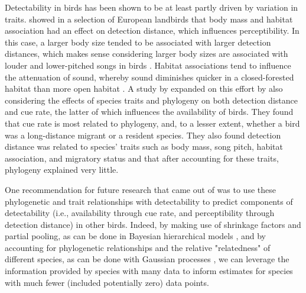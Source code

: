 \documentclass[12pt]{article}
\begin{document}
\par Detectability in birds has been shown to be at least partly driven by variation in traits.
\cite{johnston_species_2014} showed in a selection of European landbirds that body mass and habitat association had an effect on detection distance, which influences perceptibility.
In this case, a larger body size tended to be associated with larger detection distances, which makes sense considering larger body sizes are associated with louder and lower-pitched songs in birds \citep{bowman_adaptive_1979, fletcher_acoustics_1999, ryan_role_1985}.
Habitat associations tend to influence the attenuation of sound, whereby sound diminishes quicker in a closed-forested habitat than more open habitat \citep{waide_tropical_1988, yip_sound_2017}.
A study by \cite{solymos_phylogeny_2018} expanded on this effort by also considering the effects of species traits and phylogeny on both detection distance and cue rate, the latter of which influences the availability of birds.
They found that cue rate is most related to phylogeny, and, to a lesser extent, whether a bird was a long-distance migrant or a resident species.
They also found detection distance was related to species’ traits such as body mass, song pitch, habitat association, and migratory status and that after accounting for these traits, phylogeny explained very little.

\par One recommendation for future research that came out of \cite{solymos_phylogeny_2018} was to use these phylogenetic and trait relationships with detectability to predict components of detectability (i.e., availability through cue rate, and perceptibility through detection distance) in other birds.
Indeed, by making use of shrinkage factors and partial pooling, as can be done in Bayesian hierarchical models \citep{gelman_what_2021}, and by accounting for phylogenetic relationships and the relative "relatedness" of different species, as can be done with Gaussian processes \citep{bernardo_regression_1998, mcelreath_continous_2020}, we can leverage the information provided by species with many data to inform estimates for species with much fewer (included potentially zero) data points.
\end{document}
